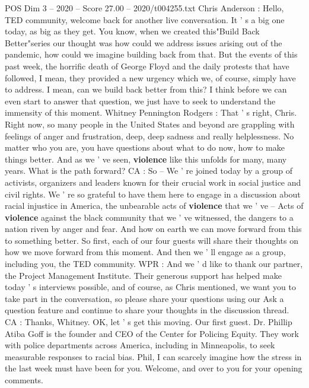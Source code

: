 \begin{textsample}{POS Dim 3 – 2020 – Score 27.00 – 2020/t004255.txt}  \label{ex:f3_pos_014}
Chris Anderson : Hello, TED community, welcome back for another live conversation.
It ' s a big one today, as big as they get.
You know, when we created this"Build Back Better"series our thought was how could we address issues arising out of the pandemic, how could we imagine building back from that.
But the events of this past week, the horrific death of George Floyd and the daily protests that have followed, I mean, they provided a new urgency which we, of course, simply have to address.
I mean, can we build back better from this?
I think before we can even start to answer that question, we just have to seek to understand the immensity of this moment.
Whitney Pennington Rodgers : That ' s right, Chris.
Right now, so many people in the United States and beyond are grappling with feelings of anger and frustration, deep, deep sadness and really helplessness.
No matter who you are, you have questions about what to do now, how to make things better.
And as we ' ve seen, \textbf{violence} like this unfolds for many, many years.
What is the path forward?
CA : So -- We ' re joined today by a group of activists, organizers and leaders known for their crucial work in social justice and civil rights.
We ' re so grateful to have them here to engage in a discussion about racial injustice in America, the unbearable acts of \textbf{violence} that we ' ve -- Acts of \textbf{violence} against the black community that we ' ve witnessed, the dangers to a nation riven by anger and fear.
And how on earth we can move forward from this to something better.
So first, each of our four guests will share their thoughts on how we move forward from this moment.
And then we ' ll engage as a group, including you, the TED community.
WPR : And we ' d like to thank our partner, the Project Management Institute.
Their generous support has helped make today ' s interviews possible, and of course, as Chris mentioned, we want you to take part in the conversation, so please share your questions using our Ask a question feature and continue to share your thoughts in the discussion thread.
CA : Thanks, Whitney.
OK, let ' s get this moving.
Our first guest.
Dr.
Phillip Atiba Goff is the founder and CEO of the Center for Policing Equity.
They work with police departments across America, including in Minneapolis, to seek measurable responses to racial bias.
Phil, I can scarcely imagine how the stress in the last week must have been for you.
Welcome, and over to you for your opening comments.

\end{textsample}
